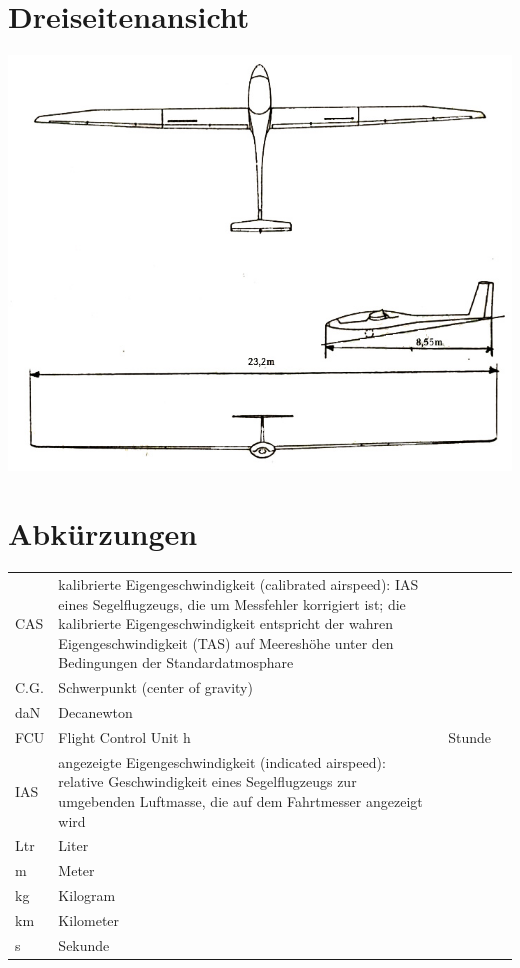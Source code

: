 \section{Dreiseitenansicht}
\vspace{4cm}
\includegraphics[width=\textwidth]{3seiten.jpg}

\section{Abkürzungen}
\begin{tabular}{p{}p{}ll} 
CAS & kalibrierte Eigengeschwindigkeit (calibrated airspeed): IAS eines Segelflugzeugs, die um Messfehler korrigiert ist; die kalibrierte Eigengeschwindigkeit entspricht der wahren Eigengeschwindigkeit (TAS) auf Meereshöhe unter den Bedingungen der Standardatmosphare \\
C.G. & Schwerpunkt (center of gravity)\\
daN & Decanewton \\
FCU & Flight Control Unit
h & Stunde \\
IAS & angezeigte Eigengeschwindigkeit (indicated airspeed): relative Geschwindigkeit eines Segelflugzeugs zur umgebenden Luftmasse, die auf dem Fahrtmesser angezeigt wird \\
Ltr & Liter \\
m & Meter \\
kg & Kilogram  \\
km & Kilometer \\
s & Sekunde \\

\end{tabular}

